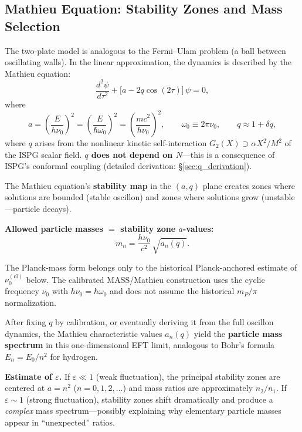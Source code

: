 \documentclass[11pt]{article}
\begin{document}
\subsection{Mathieu Equation: Stability Zones and Mass Selection}

The two-plate model is analogous to the Fermi--Ulam problem
(a ball between oscillating walls). In the linear approximation,
the dynamics is described by the Mathieu equation:
\begin{equation}
  \frac{d^2\psi}{d\tau^2}
  + \bigl[a - 2q\cos(2\tau)\bigr]\,\psi = 0,
  \label{eq:mathieu_general}
\end{equation}
where
\begin{equation}
  a = \left(\frac{E}{h\nu_0}\right)^2
  = \left(\frac{E}{\hbar\omega_0}\right)^2
  = \left(\frac{mc^2}{h\nu_0}\right)^2,
  \qquad
  \omega_0 \equiv 2\pi\nu_0,
  \qquad
  q \approx 1 + \delta q,
  \label{eq:mathieu_params}
\end{equation}
where $q$ arises from the nonlinear kinetic self-interaction
$G_2(X) \supset \alpha X^2/M^2$ of the ISPG scalar field.
\textbf{$q$ does not depend on $N$}---this is a consequence of
ISPG's conformal coupling
(detailed derivation: \S\ref{sec:q_derivation}).

The Mathieu equation's \textbf{stability map} in the $(a, q)$
plane creates zones where solutions are bounded (stable oscillon)
and zones where solutions grow (unstable---particle decays).

\textbf{Allowed particle masses $=$ stability zone $a$-values:}
\begin{equation}
  m_n = \frac{h\nu_0}{c^2}\,\sqrt{a_n(q)}.
  \label{eq:mass_from_mathieu}
\end{equation}

The Planck-mass form belongs only to the historical
Planck-anchored estimate of $\nu_0^{(\mathrm{cl})}$ below.
The calibrated MASS/Mathieu construction uses the cyclic
frequency $\nu_0$ with $h\nu_0=\hbar\omega_0$ and does not
assume the historical $m_P/\pi$ normalization.

After fixing $q$ by calibration, or eventually deriving it from
the full oscillon dynamics, the Mathieu characteristic values
$a_n(q)$ yield the \textbf{particle mass spectrum} in this
one-dimensional EFT limit,
analogous to Bohr's formula $E_n = E_0/n^2$ for hydrogen.

\textbf{Estimate of $\varepsilon$.}
If $\varepsilon \ll 1$ (weak fluctuation), the principal stability
zones are centered at $a = n^2$ ($n = 0, 1, 2, \ldots$) and mass
ratios are approximately $n_2/n_1$.
If $\varepsilon \sim 1$ (strong fluctuation), stability zones shift
dramatically and produce a \emph{complex} mass spectrum---possibly
explaining why elementary particle masses appear in ``unexpected''
ratios.
\end{document}
